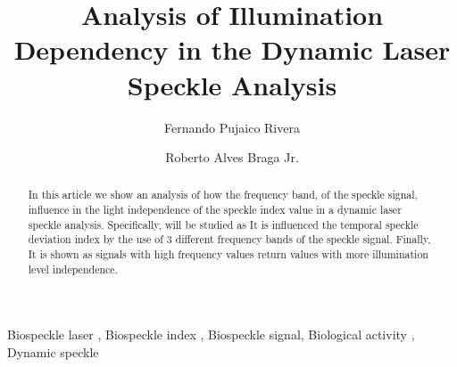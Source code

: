 \documentclass[review]{elsarticle}
\begin{document}
 

\begin{frontmatter}

\title{Analysis of Illumination Dependency  in the Dynamic Laser Speckle Analysis}



\author{Fernando Pujaico Rivera}
\author{Roberto Alves Braga Jr.}



\address{University Federal of Lavras, Lavras, Brazil}
% 


\begin{abstract}
In this article we show an analysis of how the frequency band,
of the speckle signal, influence in the
light independence of the speckle index value in a dynamic laser speckle analysis. 
Specifically, 
will be studied as It is influenced the temporal speckle deviation 
index by the use of 3 different frequency bands of the speckle signal.
Finally, It is shown as signals with high frequency values
return values with more illumination level independence.
\end{abstract}

\begin{keyword}
Biospeckle laser \sep 
Biospeckle index \sep 
Biospeckle signal\sep 
Biological activity \sep
Dynamic speckle 
\end{keyword}

\end{frontmatter}

\linenumbers

\end{document}
